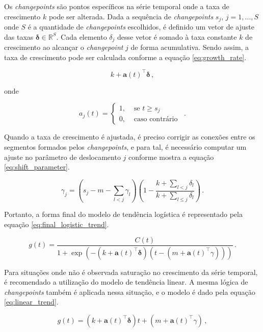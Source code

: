 Os \textit{changepoints} são pontos específicos na série temporal onde a taxa de crescimento $k$ pode ser alterada. Dada a sequência de \textit{changepoints} $s_{j}$, $j=1, \ldots, S$ onde $S$ é a quantidade de \textit{changepoints} escolhidos, é definido um vetor de ajuste das taxas $\boldsymbol{\delta} \in \mathbb{R}^{S}$. Cada elemento $\delta_{j}$ desse vetor é somado à taxa constante $k$ de crescimento ao alcançar o \textit{changepoint} $j$ de forma acumulativa. Sendo assim, a taxa de crescimento pode ser calculada conforme a equação \eqref{eq:growth_rate}.

\begin{equation}\label{eq:growth_rate}
    k+\mathbf{a}(t)^{\top} \boldsymbol{\delta}\, ,
\end{equation}

onde

\[
    a_{j}(t)= \begin{cases}1, & \text { se } t \geq s_{j} \\ 0, & \text { caso contrário }\end{cases}\, .
\]

Quando a taxa de crescimento é ajustada, é preciso corrigir as conexões entre os segmentos formados pelos \textit{changepoints}, e para tal, é necessário computar um ajuste no parâmetro de deslocamento $j$ conforme mostra a equação \eqref{eq:shift_parameter}.

\begin{equation}\label{eq:shift_parameter}
    \gamma_{j}=\left(s_{j}-m-\sum_{l<j} \gamma_{l}\right)\left(1-\frac{k+\sum_{l<j} \delta_{l}}{k+\sum_{l \leq j} \delta_{l}}\right)\, .
\end{equation}

Portanto, a forma final do modelo de tendência logística é representado pela equação \eqref{eq:final_logistic_trend}.

\begin{equation}\label{eq:final_logistic_trend}
    g(t)=\frac{C(t)}{1+\exp \left(-\left(k+\mathbf{a}(t)^{\top} \boldsymbol{\delta}\right)\left(t-\left(m+\mathbf{a}(t)^{\top} \gamma\right)\right)\right)}\, .
\end{equation}

Para situações onde não é observada saturação no crescimento da série temporal, é recomendado a utilização do modelo de tendência linear. A mesma lógica de \textit{changepoints} também é aplicada nessa situação, e o modelo é dado pela equação \eqref{eq:linear_trend}.

\begin{equation}\label{eq:linear_trend}
    g(t)=\left(k+\mathbf{a}(t)^{\top} \boldsymbol{\delta}\right) t+\left(m+\mathbf{a}(t)^{\top} \gamma\right)\, ,
\end{equation}


